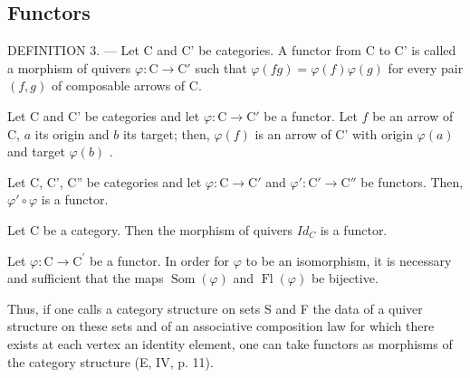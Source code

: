 \subsection{Functors}

DEFINITION 3. --- Let C and C' be categories. A functor from C to C' is called a morphism of quivers \(\varphi\colon\mathrm{C}\to\mathrm{C}'\) such that \(\varphi(fg)=\varphi(f)\varphi(g)\) for every pair \((f,g)\) of composable arrows of C.

Let C and C' be categories and let \(\varphi\colon\mathrm{C}\to\mathrm{C}'\) be a functor. Let \(f\) be an arrow of C, \(a\) its origin and \(b\) its target; then, \(\varphi(f)\) is an arrow of C' with origin \(\varphi(a)\) and target \(\varphi(b)\) .

Let C, C', C'' be categories and let \(\varphi\colon\mathrm{C}\to\mathrm{C}'\) and \(\varphi'\colon\mathrm{C}'\to\mathrm{C}''\) be functors. Then, \(\varphi'\circ\varphi\) is a functor.

Let C be a category. Then the morphism of quivers \(Id_{C}\) is a functor.

Let \(\varphi\colon\mathrm{C}\to\mathrm{C}^{\prime}\) be a functor. In order for \(\varphi\) to be an isomorphism, it is necessary and sufficient that the maps \(\operatorname{Som}(\varphi)\) and \(\operatorname{Fl}(\varphi)\) be bijective.

Thus, if one calls a category structure on sets S and F the data of a quiver structure on these sets and of an associative composition law for which there exists at each vertex an identity element, one can take functors as morphisms of the category structure (E, IV, p. 11).

